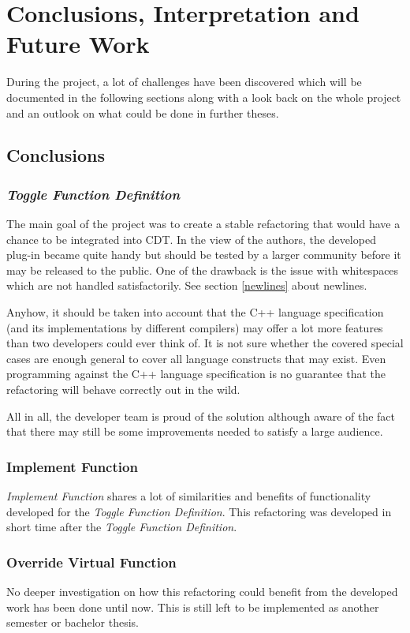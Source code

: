 \chapter{Conclusions, Interpretation and Future Work}
\thispagestyle{fancy}

During the project, a lot of challenges have been discovered which will be 
documented in the following sections along with a look back on the whole project 
and an outlook on what could be done in further theses. 

\section{Conclusions}

\subsection{\textit{Toggle Function Definition}}
The main goal of the project was to create a stable refactoring that would have 
a chance to be integrated into CDT. In the view of the authors, the developed 
plug-in became quite handy but should be tested by a larger community before it 
may be released to the public. One of the drawback is the issue with
whitespaces which are not handled satisfactorily. See section \ref{newlines}
about newlines.

Anyhow, it should be taken into account that the C++ language specification (and 
its implementations by different compilers) may offer a lot more features 
than two developers could ever think of. It is not sure whether the covered
special cases are enough general to cover all language constructs that may
exist. Even programming against the C++ language specification is no guarantee
that the refactoring will behave correctly out in the wild.

All in all, the developer team is proud of the solution although aware of the 
fact that there may still be some improvements needed to satisfy a large 
audience.

\subsection{Implement Function}
\textit{Implement Function} shares a lot of similarities and benefits of
functionality developed for the \textit{Toggle Function Definition}. This
refactoring was developed in short time after the \textit{Toggle Function
Definition}.

\subsection{Override Virtual Function}
No deeper investigation on how this refactoring could benefit from the developed 
work has been done until now. This is still left to be implemented as another
semester or bachelor thesis.

